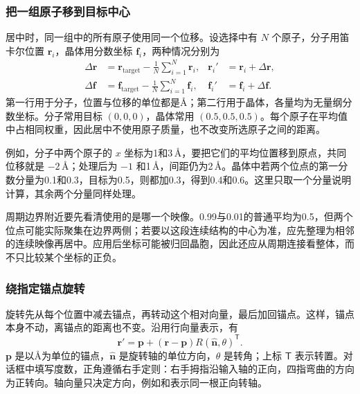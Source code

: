 \subsubsection{把一组原子移到目标中心}

居中时，同一组中的所有原子使用同一个位移。设选择中有 $N$ 个原子，分子用笛卡尔位置 $\mathbf r_i$，晶体用分数坐标 $\mathbf f_i$，两种情况分别为
\begin{equation}
 \begin{aligned}
 \Delta\mathbf r&=\mathbf r_{\mathrm{target}}-
        \frac1N\sum_{i=1}^{N}\mathbf r_i,
 &\mathbf r_i'&=\mathbf r_i+\Delta\mathbf r,\\
 \Delta\mathbf f&=\mathbf f_{\mathrm{target}}-
        \frac1N\sum_{i=1}^{N}\mathbf f_i,
 &\mathbf f_i'&=\mathbf f_i+\Delta\mathbf f.
 \end{aligned}
 \label{eq:center-selected-atoms}
\end{equation}
第一行用于分子，位置与位移的单位都是\AA；第二行用于晶体，各量均为无量纲分数坐标。分子常用目标 $(0,0,0)$，晶体常用 $(0.5,0.5,0.5)$。每个原子在平均值中占相同权重，因此居中不使用原子质量，也不改变所选原子之间的距离。

例如，分子中两个原子的 $x$ 坐标为1和3\,\AA，要把它们的平均位置移到原点，共同位移就是 $-2\,\text{\AA}$；处理后为 $-1$ 和1\,\AA，间距仍为2\,\AA。晶体中若两个位点的第一分数分量为0.1和0.3，目标为0.5，则都加0.3，得到0.4和0.6。这里只取一个分量说明计算，其余两个分量同样处理。

周期边界附近要先看清使用的是哪一个映像。0.99与0.01的普通平均为0.5，但两个位点可能实际聚集在边界两侧；若要以这段连续结构的中心为准，应先整理为相邻的连续映像再居中。应用后坐标可能被归回晶胞，因此还应从周期连接看整体，而不只比较某个坐标的正负。

\subsubsection{绕指定锚点旋转}

旋转先从每个位置中减去锚点，再转动这个相对向量，最后加回锚点。这样，锚点本身不动，离锚点的距离也不变。沿用行向量表示，有
\begin{equation}
 \mathbf r'=\mathbf p+(\mathbf r-\mathbf p)
              R(\hat{\mathbf n},\theta)^{\mathsf T}.
 \label{eq:rotate-row-position}
\end{equation}
$\mathbf p$ 是以\AA 为单位的锚点，$\hat{\mathbf n}$ 是旋转轴的单位方向，$\theta$ 是转角；上标 $\mathsf T$ 表示转置。对话框中填写度数，正角遵循右手定则：右手拇指沿输入轴的正向，四指弯曲的方向为正转向。轴向量只决定方向，例如和表示同一根正向转轴。

